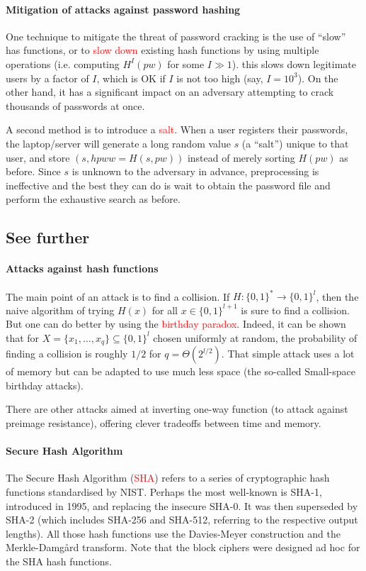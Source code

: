 \documentclass[a4paper, 11pt, openany]{book}
\numberwithin{equation}{section}
\theoremstyle{plain}
\theoremstyle{definition}
\newcommand{\Important}[1]{\textcolor{red}{#1}}
\begin{document}
\paragraph{Mitigation of attacks against password hashing}
One technique to mitigate the threat of password cracking is the use of ``slow'' has functions, or to \Important{slow down} existing hash functions by using multiple operations (i.e. computing $H^I(pw)$ for some $I \gg 1$). this slows down legitimate users by a factor of $I$, which is OK if $I$ is not too high (say, $I = 10^3$). On the other hand, it has a significant impact on an adversary attempting to crack thousands of passwords at once.

A second method is to introduce a \Important{salt}. When a user registers their passwords, the laptop/server will generate a long random value $s$ (a ``salt'') unique to that user, and store $(s, hpww = H(s, pw))$ instead of merely sorting $H(pw)$ as before. Since $s$ is unknown to the adversary in advance, preprocessing is ineffective and the best they can do is wait to obtain the password file and perform the exhaustive search as before.




\subsection{See further}

\paragraph{Attacks against hash functions}
The main point of an attack is to find a collision. If $H : \{0,1\}^* \to \{0,1\}^l$, then the naive algorithm of trying $H(x)$ for all $x \in \{0,1\}^{l+1}$ is sure to find a collision. But one can do better by using the \Important{birthday paradox}. Indeed, it can be shown that for $X = \{x_1, \dots, x_q\} \subseteq \{0,1\}^l$ chosen uniformly at random, the probability of finding a collision is roughly $1/2$ for $q = \Theta(2^{l/2})$. That simple attack uses a lot of memory but can be adapted to use much less space (the so-called Small-space birthday attacks).

There are other attacks aimed at inverting one-way function (to attack against preimage resistance), offering clever tradeoffs between time and memory.


\paragraph{Secure Hash Algorithm}
The Secure Hash Algorithm (\Important{SHA}) refers to a series of cryptographic hash functions standardised by NIST. Perhaps the most well-known is SHA-1, introduced in 1995, and replacing the insecure SHA-0. It was then superseded by SHA-2 (which includes SHA-256 and SHA-512, referring to the respective output lengths). All those hash functions use the Davies-Meyer construction and the Merkle-Damg\aa{}rd transform. Note that the block ciphers were designed ad hoc for the SHA hash functions.
\end{document}
